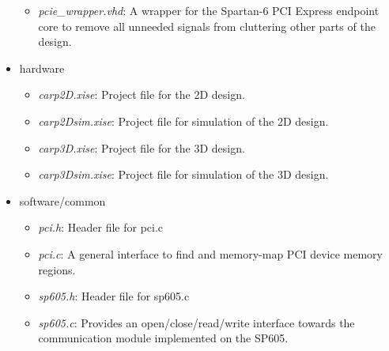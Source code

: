 \begin{itemize}
\begin{itemize}
        \item \emph{pcie\_wrapper.vhd}: A wrapper for the Spartan-6 PCI Express endpoint core to remove all unneeded signals from cluttering other parts of the design.
    \end{itemize}
    \item hardware
    \begin{itemize}
        \item \emph{carp2D.xise}: Project file for the 2D design.
        \item \emph{carp2Dsim.xise}: Project file for simulation of the 2D design.
        \item \emph{carp3D.xise}: Project file for the 3D design.
        \item \emph{carp3Dsim.xise}: Project file for simulation of the 3D design.
    \end{itemize}
    \item software/common
    \begin{itemize}
        \item \emph{pci.h}: Header file for pci.c
        \item \emph{pci.c}: A general interface to find and memory-map PCI device memory regions.
        \item \emph{sp605.h}: Header file for sp605.c
        \item \emph{sp605.c}: Provides an open/close/read/write interface towards the communication module implemented on the SP605.
    \end{itemize}
\end{itemize}

